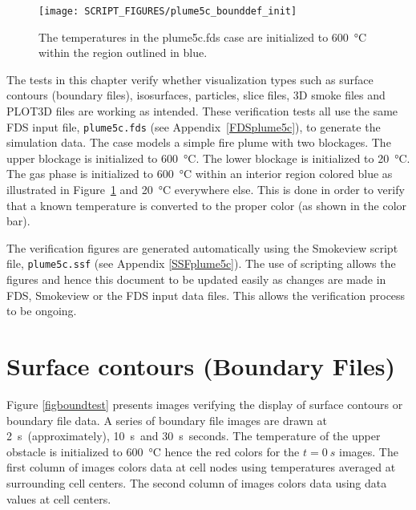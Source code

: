 \documentclass[11pt,twoside]{book}
\begin{document}
\begin{figure}[\figoptions]
\begin{center}
\texttt{[image: SCRIPT\_FIGURES/plume5c\_bounddef\_init]}
\end{center}
\caption{The temperatures in the plume5c.fds case are initialized to \SI{600}{\degreeCelsius} within the region outlined in blue.}
\label{figbounddef}%
\end{figure}

The tests in this chapter verify whether visualization types such as surface contours (boundary files), isosurfaces, particles, slice files, 3D smoke files and PLOT3D files are working as intended.  These verification tests all use the same FDS input file, {\tt plume5c.fds} (see Appendix~\ref{FDSplume5c}), to generate the simulation data.  The case models a simple fire plume with two blockages.  The upper blockage is initialized to \SI{600}{\degreeCelsius}.   The lower blockage is initialized to \SI{20}{\degreeCelsius}.  The gas phase is initialized to \SI{600}{\degreeCelsius} within an interior region colored blue as illustrated in Figure~\ref{figbounddef} and \SI{20}{\degreeCelsius} everywhere else.  This is done in order to verify that a known temperature is converted to the proper color (as shown in the color bar).

The verification figures are generated automatically using the Smokeview script file, {\tt plume5c.ssf} (see Appendix \ref{SSFplume5c}).  The use of scripting allows the figures and hence this document to be updated easily as changes are made in FDS, Smokeview or the FDS input data files.  This allows the verification process to be ongoing.

\clearpage

\section{Surface contours (Boundary Files)}
Figure \ref{figboundtest} presents images verifying the display of surface contours or boundary file data. A series of boundary file images are drawn at \SI{2}{s}\ (approximately), \SI{10}{s}\ and \SI{30}{s}\ seconds. The temperature of the upper obstacle is initialized to \SI{600}{\degreeCelsius} hence the red colors for the $t=\SI{0}{s}$ images. The first column of images colors data at cell nodes using temperatures averaged at surrounding cell centers.  The second column of images colors data using data values at cell centers.
\end{document}
